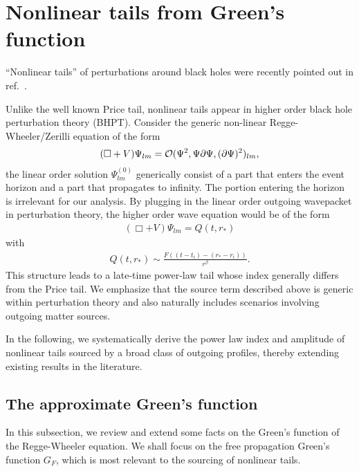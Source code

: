 \documentclass[reprint,aps,physrev,superscriptaddress,10pt,notitlepage,prd,nofootinbib,onecolumn]{revtex4-2}
\newcommand{\Revise}[1]{{\color{red} #1}}
\begin{document}
\section{Nonlinear tails from Green's function}
\label{sec:nonlinear_tail_analytics}

``Nonlinear tails'' of perturbations around black holes were recently pointed out in ref.~\cite{Okuzumi:2008ej,Lagos:2022otp,Cardoso:2024jme}.
\Revise{Unlike the well known Price tail, nonlinear tails appear in higher order black hole perturbation theory (BHPT). Consider the generic non-linear Regge-Wheeler/Zerilli equation of the form 
\begin{align}
    (\Box + V)\Psi_{l m}  = {\cal O}(\Psi^2, \Psi \partial \Psi, (\partial \Psi)^2)_{lm}, 
\end{align}
the linear order solution $\Psi^{(0)}_{lm}$ generically consist of a part that enters the event horizon and a part that propagates to infinity. The portion entering the horizon is irrelevant for our analysis. By plugging in the linear order outgoing wavepacket in perturbation theory, the higher order wave equation would be of the form 
\begin{align}
      (\Box + V)\Psi_{l m}  = Q(t, r_*)
\end{align}
with 
\begin{align}
   Q(t, r_*)\sim   \frac{F((t-t_i)-(r_*-r_i))}{r^\beta}.
\end{align}
This structure leads to a late-time power-law tail whose index generally differs from the Price tail.
We emphasize that the source term described above is generic within perturbation theory and also naturally includes scenarios involving outgoing matter sources.

In the following, we systematically derive the power law index and amplitude of nonlinear tails sourced by a broad class of outgoing profiles, thereby extending existing results in the literature.}



\subsection{The approximate Green's function}
\label{sec:G_analytical_approximation}
In this subsection, we review and extend some facts on the Green's function of the Regge-Wheeler equation.
We shall focus on the free propagation Green's function $G_F$, which is most relevant to the sourcing of nonlinear tails.
\end{document}
